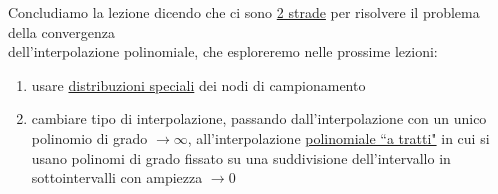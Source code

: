 \documentclass[12pt,headings=optiontohead]{article}
\begin{document}
Concludiamo la lezione dicendo che ci sono \uline{2 strade} per risolvere il problema della convergenza \\ dell'interpolazione polinomiale, che esploreremo nelle prossime lezioni:
\begin{enumerate}
    \item usare \uline{distribuzioni speciali} dei nodi di campionamento
    \item cambiare tipo di interpolazione, passando dall'interpolazione con un unico polinomio di grado $\to \infty$, all'interpolazione \uline{polinomiale ``a tratti"} in cui si usano polinomi di grado fissato su una suddivisione dell'intervallo in sottointervalli con ampiezza $\to 0$
\end{enumerate}
\end{document}
